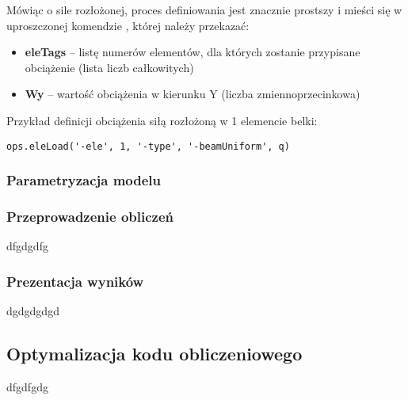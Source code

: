 Mówiąc o sile rozłożonej, proces definiowania jest znacznie prostszy i mieści się w uproszczonej komendzie
, której należy przekazać:

\begin{itemize}
    \item \textbf{eleTags} – listę numerów elementów, dla których zostanie przypisane obciążenie (lista liczb całkowitych)
    \item \textbf{Wy} – wartość obciążenia w kierunku Y (liczba zmiennoprzecinkowa)
\end{itemize}

Przykład definicji obciążenia siłą rozłożoną w 1 elemencie belki:
\begin{lstlisting}
ops.eleLoad('-ele', 1, '-type', '-beamUniform', q)
\end{lstlisting}

\subsubsection{Parametryzacja modelu}

\subsubsection{Przeprowadzenie obliczeń}

dfgdgdfg

\subsubsection{Prezentacja wyników}

dgdgdgdgd

\subsection{Optymalizacja kodu obliczeniowego}

dfgdfgdg
